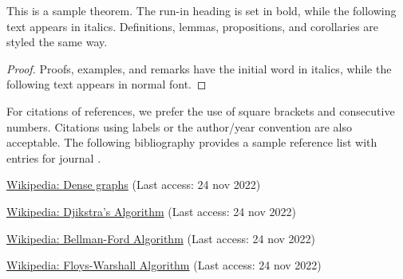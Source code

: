 \documentclass[runningheads]{llncs}
\begin{document}
\begin{theorem}
This is a sample theorem. The run-in heading is set in bold, while
the following text appears in italics. Definitions, lemmas,
propositions, and corollaries are styled the same way.
\end{theorem}
%
%
\begin{proof}
Proofs, examples, and remarks have the initial word in italics,
while the following text appears in normal font.
\end{proof}
For citations of references, we prefer the use of square brackets
and consecutive numbers. Citations using labels or the author/year
convention are also acceptable. The following bibliography provides
a sample reference list with entries for journal
\cite{ref_url_Dj}.
%
%
%

% 
%
\begin{thebibliography}{8}
\href{https://en.wikipedia.org/wiki/Dense_graph}{Wikipedia: Dense graphs} (Last access: 24 nov 2022)

\href{https://en.wikipedia.org/wiki/Dijkstra\%27s_algorithm}{Wikipedia: Djikstra's Algorithm} (Last access: 24 nov 2022)

\href{https://en.wikipedia.org/wiki/Bellman\%E2\%80\%93Ford_algorithm}{Wikipedia: Bellman-Ford Algorithm} (Last access: 24 nov 2022)

\href{https://en.wikipedia.org/wiki/Floyd\%E2\%80\%93Warshall_algorithm}{Wikipedia: Floys-Warshall Algorithm} (Last access: 24 nov 2022)
\end{thebibliography}
\end{document}
